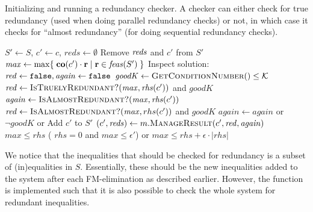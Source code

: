 \begin{algorithm}[htbp]
\begin{algorithmic}\caption{Initializing and running a redundancy checker. A checker can either check for true redundancy (used when doing parallel redundancy checks) or not, in which case it checks for ``almost redundancy'' (for doing sequential redundancy checks).}\label{alg:checker}
	\State $S'\gets S$, $c'\gets c$, $\mathit{reds}\gets \emptyset$
		\State Remove $\mathit{reds}$ and $c'$ from $S'$
		\State $\mathit{max} \gets \max\{\;{\mathbf{co}(c')\cdot\mathbf{r}}\;|\;{\mathbf{r}\in \mathit{feas}(S')}\;\}$
		\State Inspect solution:
		\Indent
			\State $\mathit{red}\gets \texttt{false}, \mathit{again}\gets \texttt{false}$
			\State $\mathit{goodK} \gets \Call{GetConditionNumber}{\null}\leq \mathcal{K}$
				\State $\mi{red} \gets \Call{IsTruelyRedundant?}{\mathit{max}, \rhs(c')}$ and $\mathit{goodK}$
				\State $\mathit{again} \gets \Call{IsAlmostRedundant?}{\mathit{max}, \rhs(c')}$
			\Else
				\State$\mi{red} \gets \Call{IsAlmostRedundant?}{\mathit{max}, rhs(c')}$ and $\mathit{goodK}$
			\EndIf
			\State $\mathit{again} \gets \mathit{again}$ or $\neg \mathit{goodK}$ or 
		\EndIndent
			\State Add $c'$ to $S'$
		\EndIf
		\State $(c', \mi{reds})\gets m.\Call{ManageResult}{c', \mathit{red}, \mathit{again}}$
	\EndWhile
	\Return
\EndFunction
\State
{}
	\State\Return $\mathit{max} \leq \mathit{rhs}$
\EndFunction
\State
{}
		\State\Return ( $\mathit{rhs} = 0$ and $\mathit{max} \leq \epsilon'$) or 
				$\mathit{max} \leq \mathit{rhs} + \epsilon\cdot |\mathit{rhs}|$
\EndFunction
\end{algorithmic}
\end{algorithm}

We notice that the inequalities that should be checked for redundancy is a subset of (in)equalities in $S$. Essentially, these should be the new inequalities added to the system after each FM-elimination as described earlier. However, the function is implemented such that it is also possible to check the whole system for redundant inequalities.

